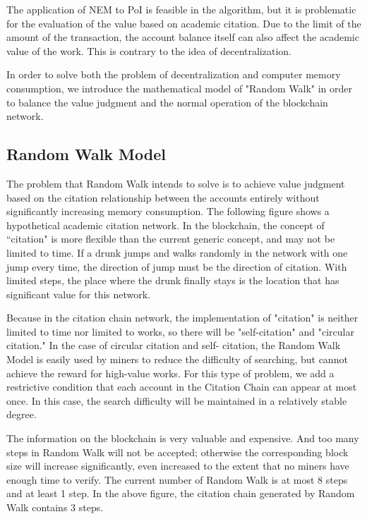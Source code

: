 \documentclass[a4paper,oneside,openany]{tufte-book}
\begin{document}
The application of NEM to PoI is feasible in the algorithm, but it is problematic for the evaluation of the value based on academic citation. Due to the limit of the amount of the transaction, the account balance itself can also affect the academic value of the work. This is contrary to the idea of decentralization.



In order to solve both the problem of decentralization and computer memory consumption, we introduce the mathematical model of "Random Walk" in order to balance the value judgment and the normal operation of the blockchain network.

\subsection{Random Walk Model}


The problem that Random Walk intends to solve is to achieve value judgment based on the citation relationship between the accounts entirely  without significantly increasing memory consumption. The following figure shows a hypothetical academic citation network. In the blockchain, the concept of “citation" is more flexible than the current generic concept, and may not be limited to time. If a drunk jumps and walks randomly in the network with one jump every time, the direction of jump must be the direction of citation. With limited steps, the place where the drunk finally stays is the location that has significant value for this network. 




Because in the citation chain network, the implementation of "citation" is neither limited to time nor limited to works, so there will be "self-citation" and "circular citation." In the case of circular citation and self- citation, the Random Walk Model is easily used by miners to reduce the difficulty of searching, but cannot achieve the reward for high-value works. For this type of problem, we add a restrictive condition that each account in the Citation Chain can appear at most once. In this case, the search difficulty will be maintained in a relatively stable degree.





The information on the blockchain is very valuable and expensive. And too many steps in Random Walk will not be accepted; otherwise the corresponding block size will increase significantly, even increased to the extent that no miners have enough time to verify. The current number of Random Walk is at most 8 steps and at least 1 step. In the above figure, the citation chain generated by Random Walk contains 3 steps.
\end{document}
